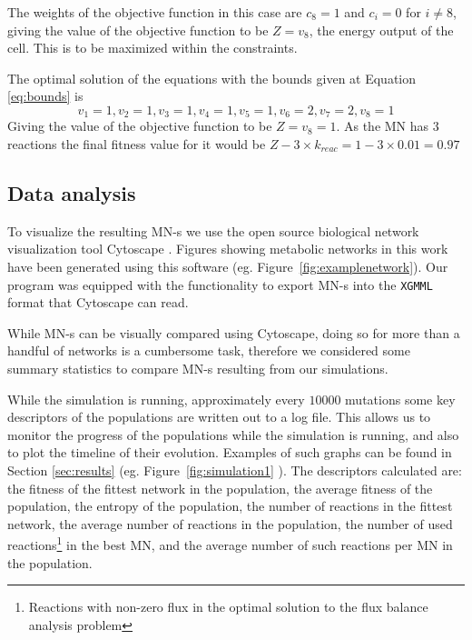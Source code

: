 \documentclass[a4paper,12pt]{article}
\begin{document}
	The weights of the objective function in this case are $c_8=1$ and $c_i=0$ for $i\neq 8$, giving the value of the objective function to be $Z=v_8$, the energy output of the cell. This is to be maximized within the constraints.

	The optimal solution of the equations with the bounds given at Equation \ref{eq:bounds} is 
	\begin{equation}\label{eq:solution}
		v_1=1 , v_2=1, v_3=1, v_4=1, v_5=1, v_6=2, v_7=2, v_8=1
	\end{equation}
	Giving the value of the objective function to be $Z=v_8=1$. As the MN has $3$ reactions the final fitness value for it would be $Z-3\times k_{reac}=1-3\times 0.01=0.97$
\subsection{Data analysis}
\label{sub:visualization}

To visualize the resulting MN-s we use the open source biological network visualization tool Cytoscape \cite{cytoscape}. Figures showing metabolic networks in this work have been generated using this software (eg.  Figure~\ref{fig:examplenetwork}). Our program was equipped with the functionality to export MN-s into the \texttt{XGMML} format that Cytoscape can read. 

While MN-s can be visually compared using Cytoscape, doing so for more than a handful of networks is a cumbersome task, therefore we considered some summary statistics to compare MN-s resulting from our simulations.

While the simulation is running, approximately every $10000$ mutations some key descriptors of the populations are written out to a log file. This allows us to monitor the progress of the populations while the simulation is running, and also to plot the timeline of their evolution. Examples of such graphs can be found in Section \ref{sec:results} (eg. Figure~\ref{fig:simulation1} ). The descriptors calculated are: the fitness of the fittest network in the population, the average fitness of the population, the entropy of the population, the number of reactions in the fittest network, the average number of reactions in the population, the number of used reactions\footnote{Reactions with non-zero flux in the optimal solution to the flux balance analysis problem} in the best MN, and the average number of such reactions per MN in the population. 
\end{document}

